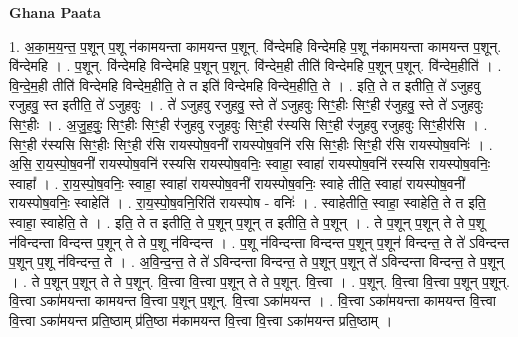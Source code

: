 \documentclass[17pt]{extarticle}
\begin{document}
\textbf{Ghana Paata } \newline

1. अ॒का॒म॒य॒न्त॒ प॒शून् प॒शू न॑कामयन्ता कामयन्त प॒शून्. वि॑न्देमहि विन्देमहि प॒शू न॑कामयन्ता कामयन्त प॒शून्. वि॑न्देमहि । . प॒शून्. वि॑न्देमहि विन्देमहि प॒शून् प॒शून्. वि॑न्देम॒ही तीति॑ विन्देमहि प॒शून् प॒शून्. वि॑न्देम॒हीति॑ । . वि॒न्दे॒म॒ही तीति॑ विन्देमहि विन्देम॒हीति॒ ते त इति॑ विन्देमहि विन्देम॒हीति॒ ते । . इति॒ ते त इतीति॒ ते॑ ऽजुहवु रजुहवु॒ स्त इतीति॒ ते॑ ऽजुहवुः । . ते॑ ऽजुहवु रजुहवु॒ स्ते ते॑ ऽजुहवुः सिꣳ॒॒हीः सिꣳ॒॒ही र॑जुहवु॒ स्ते ते॑ ऽजुहवुः सिꣳ॒॒हीः । . अ॒जु॒ह॒वुः॒ सिꣳ॒॒हीः सिꣳ॒॒ही र॑जुहवु रजुहवुः सिꣳ॒॒ही र॑स्यसि सिꣳ॒॒ही र॑जुहवु रजुहवुः सिꣳ॒॒हीर॑सि । . सिꣳ॒॒ही र॑स्यसि सिꣳ॒॒हीः सिꣳ॒॒ही र॑सि रायस्पोष॒वनी॑ रायस्पोष॒वनि॑ रसि सिꣳ॒॒हीः सिꣳ॒॒ही र॑सि रायस्पोष॒वनिः॑ । . अ॒सि॒ रा॒य॒स्पो॒ष॒वनी॑ रायस्पोष॒वनि॑ रस्यसि रायस्पोष॒वनिः॒ स्वाहा॒ स्वाहा॑ रायस्पोष॒वनि॑ रस्यसि रायस्पोष॒वनिः॒ स्वाहा᳚ । . रा॒य॒स्पो॒ष॒वनिः॒ स्वाहा॒ स्वाहा॑ रायस्पोष॒वनी॑ रायस्पोष॒वनिः॒ स्वाहे तीति॒ स्वाहा॑ रायस्पोष॒वनी॑ रायस्पोष॒वनिः॒ स्वाहेति॑ । . रा॒य॒स्पो॒ष॒वनि॒रिति॑ रायस्पोष - वनिः॑ । . स्वाहेतीति॒ स्वाहा॒ स्वाहेति॒ ते त इति॒ स्वाहा॒ स्वाहेति॒ ते । . इति॒ ते त इतीति॒ ते प॒शून् प॒शून् त इतीति॒ ते प॒शून् । . ते प॒शून् प॒शून् ते ते प॒शू न॑विन्दन्ता विन्दन्त प॒शून् ते ते प॒शू न॑विन्दन्त । . प॒शू न॑विन्दन्ता विन्दन्त प॒शून् प॒शून॑ विन्दन्त॒ ते ते॑ ऽविन्दन्त प॒शून् प॒शू न॑विन्दन्त॒ ते । . अ॒वि॒न्द॒न्त॒ ते ते॑ ऽविन्दन्ता विन्दन्त॒ ते प॒शून् प॒शून् ते॑ ऽविन्दन्ता विन्दन्त॒ ते प॒शून् । . ते प॒शून् प॒शून् ते ते प॒शून्. वि॒त्त्वा वि॒त्त्वा प॒शून् ते ते प॒शून्. वि॒त्त्वा । . प॒शून्. वि॒त्त्वा वि॒त्त्वा प॒शून् प॒शून्. वि॒त्त्वा ऽका॑मयन्ता कामयन्त वि॒त्त्वा प॒शून् प॒शून्. वि॒त्त्वा ऽका॑मयन्त । . वि॒त्त्वा ऽका॑मयन्ता कामयन्त वि॒त्त्वा वि॒त्त्वा ऽका॑मयन्त प्रति॒ष्ठाम् प्र॑ति॒ष्ठा म॑कामयन्त वि॒त्त्वा वि॒त्त्वा ऽका॑मयन्त प्रति॒ष्ठाम् । \newline
\end{document}
